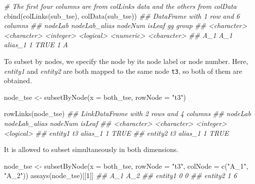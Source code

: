 \documentclass[]{article}
\newcommand{\hlnum}[1]{\textcolor[rgb]{0.816,0.125,0.439}{#1}}%
\newcommand{\hlstr}[1]{\textcolor[rgb]{0.251,0.627,0.251}{#1}}%
\newcommand{\hlcom}[1]{\textcolor[rgb]{0.502,0.502,0.502}{\textit{#1}}}%
\newcommand{\hlstd}[1]{\textcolor[rgb]{0.251,0.251,0.251}{#1}}%
\newcommand{\hlkwc}[1]{\textcolor[rgb]{0.251,0.251,0.251}{#1}}%
\newcommand{\hlkwd}[1]{\textcolor[rgb]{0.878,0.439,0.125}{#1}}%
\newenvironment{Shaded}{\begin{myshaded}}{\end{myshaded}}
\newcommand{\KeywordTok}[1]{\hlkwd{#1}}
\newcommand{\DataTypeTok}[1]{\hlkwc{#1}}
\newcommand{\DecValTok}[1]{\hlnum{#1}}
\newcommand{\StringTok}[1]{\hlstr{#1}}
\newcommand{\CommentTok}[1]{\hlcom{#1}}
\newcommand{\NormalTok}[1]{\hlstd{#1}}
\begin{document}
\begin{Shaded}
\begin{Highlighting}[]
\CommentTok{# The first four columns are from colLinks data and the others from colData}
\KeywordTok{cbind}\NormalTok{(}\KeywordTok{colLinks}\NormalTok{(sub_tse), }\KeywordTok{colData}\NormalTok{(sub_tse))}
\CommentTok{## DataFrame with 1 row and 6 columns}
\CommentTok{##         nodeLab nodeLab_alias   nodeNum    isLeaf        gg       group}
\CommentTok{##     <character>   <character> <integer> <logical> <numeric> <character>}
\CommentTok{## A_1         A_1       alias_1         1      TRUE         1           A}
\end{Highlighting}
\end{Shaded}

To subset by nodes, we specify the node by its node label or node number. Here, \emph{entity1} and \emph{entity2} are both mapped to the same node \texttt{t3}, so both of them are obtained.

\begin{Shaded}
\begin{Highlighting}[]
\NormalTok{node_tse <-}\StringTok{ }\KeywordTok{subsetByNode}\NormalTok{(}\DataTypeTok{x =}\NormalTok{ both_tse, }\DataTypeTok{rowNode =} \StringTok{"t3"}\NormalTok{)}

\KeywordTok{rowLinks}\NormalTok{(node_tse)}
\CommentTok{## LinkDataFrame with 2 rows and 4 columns}
\CommentTok{##             nodeLab nodeLab_alias   nodeNum    isLeaf}
\CommentTok{##         <character>   <character> <integer> <logical>}
\CommentTok{## entity1          t3       alias_1         1      TRUE}
\CommentTok{## entity2          t3       alias_1         1      TRUE}
\end{Highlighting}
\end{Shaded}

It is allowed to subset simultaneously in both dimensions.

\begin{Shaded}
\begin{Highlighting}[]
\NormalTok{node_tse <-}\StringTok{ }\KeywordTok{subsetByNode}\NormalTok{(}\DataTypeTok{x =}\NormalTok{ both_tse, }\DataTypeTok{rowNode =} \StringTok{"t3"}\NormalTok{, }
                         \DataTypeTok{colNode =} \KeywordTok{c}\NormalTok{(}\StringTok{"A_1"}\NormalTok{, }\StringTok{"A_2"}\NormalTok{))}
\KeywordTok{assays}\NormalTok{(node_tse)[[}\DecValTok{1}\NormalTok{]]}
\CommentTok{##         A_1 A_2}
\CommentTok{## entity1   0   0}
\CommentTok{## entity2   1   6}
\end{Highlighting}
\end{Shaded}
\end{document}
